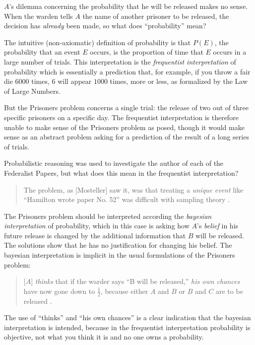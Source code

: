 \documentclass[11pt,a4paper]{article}
\begin{document}
$A$'s dilemma concerning the probability that he will be released makes no sense. When the warden tells $A$ the name of another prisoner to be released, the decision has \emph{already} been made, so what does ``probability'' mean?

The intuitive (non-axiomatic) definition of probability is that $P(E)$, the probability that an event $E$ occurs, is the proportion of time that $E$ occurs in a large number of trials.  This interpretation is the \emph{frequentist interpretation} of probability which is essentially a prediction that, for example, if you throw a fair die $6000$ times, $6$ will appear $1000$ times, more or less, as formalized by the Law of Large Numbers.  

But the Prisoners problem concerns a single trial: the release of two out of three specific prisoners on a specific day. The frequentist interpretation is therefore unable to make sense of the Prisoners problem as posed, though it would make sense as an abstract problem asking for a prediction of the result of a long series of trials.

Probabilistic reasoning was used to investigate the author of each of the Federalist Papers, but what does this mean in the frequentist interpretation?
\begin{quote}
The problem, as [Mosteller] saw it, was that treating a \emph{unique event} like ``Hamilton wrote paper No. 52'' was difficult with sampling theory \cite[p.~156, my emphasis]{mcgrayne}.
\end{quote}

The Prisoners problem should be interpreted according the \emph{bayesian interpretation} of probability, which in this case is asking how $A$'s \emph{belief} in his future release is changed by the additional information that $B$ will be released. The solutions show that he has no justification for changing his belief. The bayesian interpretation is implicit in the usual formulations of the Prisoners problem:
\begin{quote}
[$A$] \emph{thinks} that if the warder says ``B will be released,'' \emph{his own chances} have now gone down to $\frac{1}{2}$, because either $A$ and $B$ or $B$ and $C$ are to be released \cite[p.~4, my emphasis]{fifty}.
\end{quote}
The use of ``thinks'' and ``his own chances'' is a clear indication that the bayesian interpretation is intended, because in the frequentist interpretation probability is objective, not what you think it is and no one owns a probability.
\end{document}
